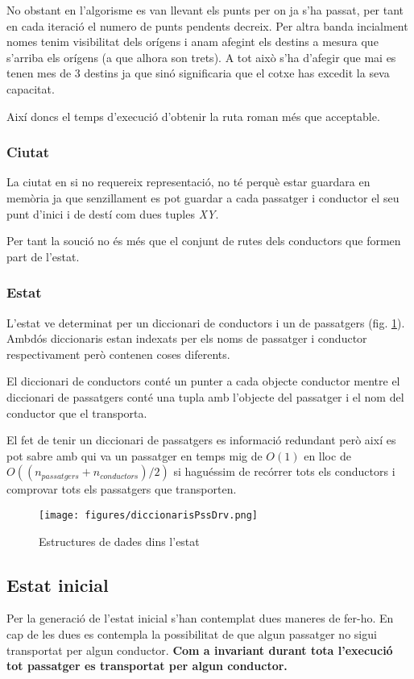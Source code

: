 No obstant en l'algorisme es van llevant els punts per on ja s'ha passat, per tant
en cada iteració el numero de punts pendents decreix. Per altra banda incialment nomes tenim
visibilitat dels orígens i anam afegint els destins a mesura que s'arriba els orígens (a que alhora son trets).
A tot això s'ha d'afegir que mai es tenen mes de 3 destins ja que sinó significaria
que el cotxe has excedit la seva capacitat.

Així doncs el temps d'execució d'obtenir la ruta roman més que acceptable.

\subsubsection{Ciutat}
La ciutat en si no requereix representació, no té perquè estar guardara en memòria ja que senzillament
es pot guardar a cada passatger i conductor el seu punt d'inici i de destí com dues tuples \emph{XY}.

Per tant la so\lgem ució no és més que el conjunt de rutes dels conductors que formen part de l'estat.

\subsubsection{Estat}
L'estat ve determinat per un diccionari de conductors i un de passatgers (fig. \ref{diccionarisPssDrv}).
Ambdós diccionaris estan indexats per els noms de passatger i conductor respectivament però contenen coses diferents.

El diccionari de conductors conté un punter a cada objecte conductor mentre el diccionari
de passatgers conté una tupla amb l'objecte del passatger i el nom del conductor que el transporta.

El fet de tenir un diccionari de passatgers es informació redundant però així es pot sabre
amb qui va un passatger en temps mig de $O(1)$ en lloc de $O((n_{passatgers} + n_{conductors})/2)$ 
si haguéssim de recórrer tots els conductors i comprovar tots els passatgers que transporten.

\begin{figure}[H]
\begin{center}
 \texttt{[image: figures/diccionarisPssDrv.png]}
 \caption{Estructures de dades dins l'estat}
 \label{diccionarisPssDrv}
\end{center}
\end{figure}


\subsection{Estat inicial}
Per la generació de l'estat inicial s'han contemplat dues maneres de fer-ho. En cap de les dues es contempla
la possibilitat de que algun passatger no sigui transportat per algun conductor. \textbf{Com a invariant durant
tota l'execució tot passatger es transportat per algun conductor.}

